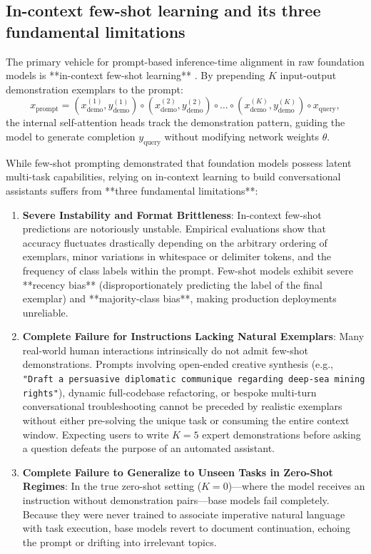 \documentclass[../../../main.tex]{subfiles}
\begin{document}
\subsection{In-context few-shot learning and its three fundamental limitations}
\label{subsec:in_context_limitations}

The primary vehicle for prompt-based inference-time alignment in raw foundation models is **in-context few-shot learning** \citep{brown2020}. By prepending $K$ input-output demonstration exemplars to the prompt:
\begin{equation}
\label{eq:few_shot_context_structure}
x_{\text{prompt}} = \left( x_{\text{demo}}^{(1)}, y_{\text{demo}}^{(1)} \right) \circ \left( x_{\text{demo}}^{(2)}, y_{\text{demo}}^{(2)} \right) \circ \dots \circ \left( x_{\text{demo}}^{(K)}, y_{\text{demo}}^{(K)} \right) \circ x_{\text{query}},
\end{equation}
the internal self-attention heads track the demonstration pattern, guiding the model to generate completion $y_{\text{query}}$ without modifying network weights $\theta$.

While few-shot prompting demonstrated that foundation models possess latent multi-task capabilities, relying on in-context learning to build conversational assistants suffers from **three fundamental limitations**:
\begin{enumerate}
    \item \textbf{Severe Instability and Format Brittleness}: In-context few-shot predictions are notoriously unstable. Empirical evaluations show that accuracy fluctuates drastically depending on the arbitrary ordering of exemplars, minor variations in whitespace or delimiter tokens, and the frequency of class labels within the prompt. Few-shot models exhibit severe **recency bias** (disproportionately predicting the label of the final exemplar) and **majority-class bias**, making production deployments unreliable.
    \item \textbf{Complete Failure for Instructions Lacking Natural Exemplars}: Many real-world human interactions intrinsically do not admit few-shot demonstrations. Prompts involving open-ended creative synthesis (e.g., \texttt{"Draft a persuasive diplomatic communique regarding deep-sea mining rights"}), dynamic full-codebase refactoring, or bespoke multi-turn conversational troubleshooting cannot be preceded by realistic exemplars without either pre-solving the unique task or consuming the entire context window. Expecting users to write $K=5$ expert demonstrations before asking a question defeats the purpose of an automated assistant.
    \item \textbf{Complete Failure to Generalize to Unseen Tasks in Zero-Shot Regimes}: In the true zero-shot setting ($K=0$)---where the model receives an instruction without demonstration pairs---base models fail completely. Because they were never trained to associate imperative natural language with task execution, base models revert to document continuation, echoing the prompt or drifting into irrelevant topics.
\end{enumerate}
\end{document}
